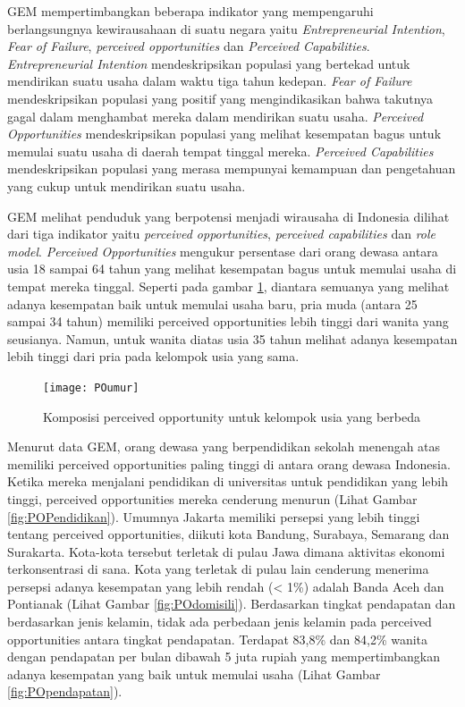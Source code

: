 GEM mempertimbangkan beberapa indikator yang mempengaruhi berlangsungnya kewirausahaan di suatu negara yaitu \textit{Entrepreneurial Intention}, \textit{Fear of Failure}, \textit{perceived opportunities} dan \textit{Perceived Capabilities}. \textit{Entrepreneurial Intention} mendeskripsikan populasi yang bertekad untuk mendirikan suatu usaha dalam waktu tiga tahun kedepan. \textit{Fear of Failure} mendeskripsikan populasi yang positif yang mengindikasikan bahwa takutnya gagal dalam menghambat mereka dalam mendirikan suatu usaha. \textit{Perceived Opportunities} mendeskripsikan populasi yang melihat kesempatan bagus untuk memulai suatu usaha di daerah tempat tinggal mereka. \textit{Perceived Capabilities} mendeskripsikan populasi yang merasa mempunyai kemampuan dan pengetahuan yang cukup untuk mendirikan suatu usaha.

GEM melihat penduduk yang berpotensi menjadi wirausaha di Indonesia
dilihat dari tiga indikator yaitu \textit{perceived opportunities}, \textit{perceived capabilities} dan \textit{role model}. \textit{Perceived Opportunities} mengukur persentase dari orang dewasa antara usia 18 sampai 64 tahun yang melihat kesempatan bagus untuk memulai usaha di tempat mereka tinggal. Seperti pada gambar \ref{fig:perceivedopportunity}, diantara semuanya yang melihat adanya kesempatan baik untuk memulai usaha baru, pria muda (antara 25 sampai 34 tahun) memiliki perceived opportunities lebih tinggi dari wanita yang seusianya. Namun, untuk wanita diatas usia 35 tahun melihat adanya kesempatan lebih tinggi dari pria pada kelompok usia yang sama.

\begin{figure} [H]
	\centering  
	\texttt{[image: POumur]} 
	\caption[Komposisi perceived opportunity untuk kelompok usia yang berbeda]{Komposisi perceived opportunity untuk kelompok usia yang berbeda} 
	\label{fig:perceivedopportunity} 
\end{figure}

Menurut data GEM, orang dewasa yang berpendidikan sekolah menengah atas memiliki perceived opportunities paling tinggi di antara orang dewasa Indonesia. Ketika mereka menjalani pendidikan di universitas untuk pendidikan yang lebih tinggi, perceived opportunities mereka cenderung menurun (Lihat Gambar \ref{fig:POPendidikan}). Umumnya Jakarta memiliki persepsi yang lebih tinggi tentang perceived opportunities, diikuti kota Bandung, Surabaya, Semarang dan Surakarta. Kota-kota tersebut terletak di pulau Jawa dimana aktivitas ekonomi terkonsentrasi di sana. Kota yang terletak di pulau lain cenderung menerima persepsi adanya kesempatan yang lebih rendah (< 1\%) adalah Banda Aceh dan Pontianak (Lihat Gambar \ref{fig:POdomisili}). Berdasarkan tingkat pendapatan dan berdasarkan jenis kelamin, tidak ada perbedaan jenis kelamin pada perceived opportunities antara tingkat pendapatan. Terdapat 83,8\% dan 84,2\% wanita dengan pendapatan per bulan dibawah 5 juta rupiah yang mempertimbangkan adanya kesempatan yang baik untuk memulai usaha (Lihat Gambar \ref{fig:POpendapatan}).

